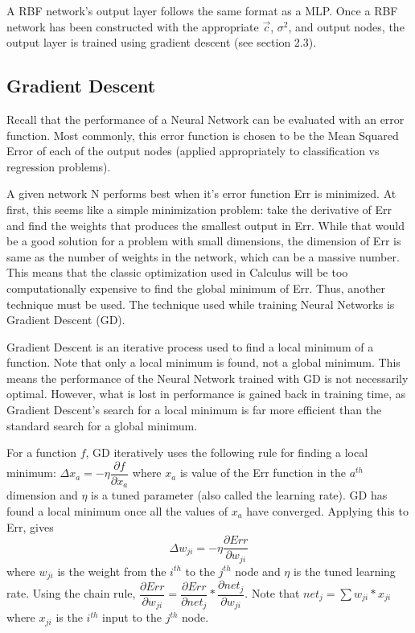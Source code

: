 \documentclass[twoside,10pt]{article}
\begin{document}
	A RBF network's output layer follows the same format as a MLP. Once a RBF network has been constructed with the appropriate $\vec c$, $\sigma^2$, and output nodes, the output layer is trained using gradient descent (see section 2.3).

\subsection{Gradient Descent}
Recall that the performance of a Neural Network can be evaluated with an error function.
Most commonly, this error function is chosen to be the Mean Squared Error of each of the output nodes (applied appropriately to classification vs regression problems).

A given network N performs best when it's error function Err is minimized.
At first, this seems like a simple minimization problem: take the derivative of Err and find the weights that produces the smallest output in Err.
While that would be a good solution for a problem with small dimensions, the dimension of Err is same as the number of weights in the network, which can be a massive number.
This means that the classic optimization used in Calculus will be too computationally expensive to find the global minimum of Err. Thus, another technique must be used.
The technique used while training Neural Networks is Gradient Descent (GD).

Gradient Descent is an iterative process used to find a local minimum of a function. Note that only a local minimum is found, not a global minimum.
This means the performance of the Neural Network trained with GD is not necessarily optimal.
However, what is lost in performance is gained back in training time, as Gradient Descent's search for a local minimum is far more efficient than the standard search for a global minimum.

For a function $f$, GD iteratively uses the following rule for finding a local minimum:
$\Delta x_a = - \eta \dfrac{\partial f}{\partial x_a}$ where $x_a$ is value of the Err function in the $a^{th}$ dimension and $\eta$ is a tuned parameter (also called the learning rate). GD has found a local minimum once all the values of $x_a$ have converged.
Applying this to Err, gives
$$\Delta w_{ji} = - \eta \dfrac{\partial Err}{\partial w_{ji}}$$
where $w_{ji}$ is the weight from the $i^{th}$ to the $j^{th}$ node and $\eta$ is the tuned learning rate. Using the chain rule,
$\dfrac{\partial Err}{\partial w_{ji}} = \dfrac{\partial Err}{\partial net_{j}} * \dfrac{\partial net_j}{\partial w_{ji}}$. Note that $net_j = \sum w_{ji} * x_{ji}$ where $x_{ji}$ is the $i^{th}$ input to the $j^{th}$ node.
\end{document}
